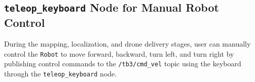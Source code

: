 \subsection{\texttt{teleop\_keyboard} Node for Manual Robot Control}
During the mapping, localization, and drone delivery stages, user can manually control the \texttt{Robot} to move forward, backward, turn left, and turn right by publishing control commands to the \texttt{/tb3/cmd\_vel} topic using the keyboard through the \texttt{teleop\_keyboard} node.
